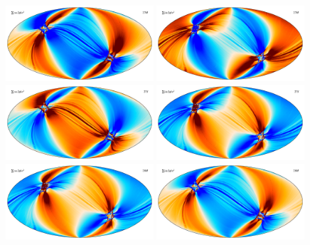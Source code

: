 \documentclass{aa}
\begin{document}
\begin{figure}
  \centering
  \includegraphics[width=0.49\textwidth]{figs/map_Q_polang27M.pdf}
  \includegraphics[width=0.49\textwidth]{figs/map_U_polang27M.pdf}\\
  \includegraphics[width=0.49\textwidth]{figs/map_Q_polang27S.pdf}
  \includegraphics[width=0.49\textwidth]{figs/map_U_polang27S.pdf}\\
  \includegraphics[width=0.49\textwidth]{figs/map_Q_polang28M.pdf}
  \includegraphics[width=0.49\textwidth]{figs/map_U_polang28M.pdf}\\

\end{figure}
\end{document}
